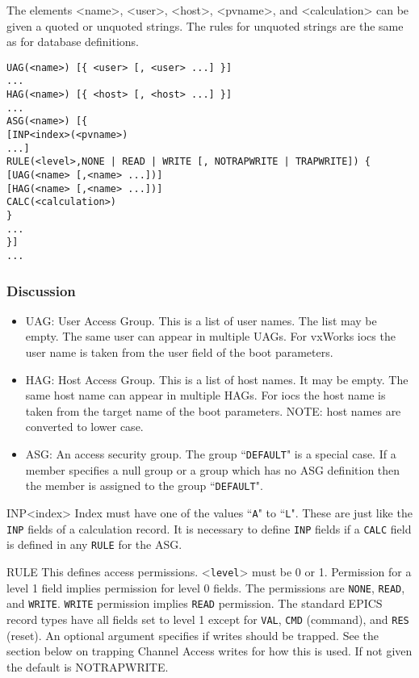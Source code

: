 The elements \textless{}name\textgreater{}, \textless{}user\textgreater{}, \textless{}host\textgreater{}, \textless{}pvname\textgreater{}, and \textless{}calculation\textgreater{} can be given a quoted or unquoted strings. The 
rules for unquoted strings are the same as for database definitions.



\begin{verbatim}UAG(<name>) [{ <user> [, <user> ...] }]
...
HAG(<name>) [{ <host> [, <host> ...] }]
...
ASG(<name>) [{
[INP<index>(<pvname>)
...]
RULE(<level>,NONE | READ | WRITE [, NOTRAPWRITE | TRAPWRITE]) {
[UAG(<name> [,<name> ...])]
[HAG(<name> [,<name> ...])]
CALC(<calculation>)
}
...
}]
...
\end{verbatim}
\subsubsection{Discussion}

\begin{itemize}\item {}UAG:  User Access Group. This is a list of user names. The list may be empty. The same user can appear in 
multiple UAGs. For vxWorks iocs the user name is taken from the user field of the boot parameters.

\item {}HAG: Host Access Group. This is a list of host names. It may be empty. The same host name can appear in 
multiple HAGs. For iocs the host name is taken from the target name of the boot parameters. NOTE: host names 
are converted to lower case.

\item {}ASG: An access security group. The group ``\verb|DEFAULT|" is a special case. If a member specifies a null group or a 
group which has no ASG definition then the member is assigned to the group ``\verb|DEFAULT|".

\end{itemize}INP\textless{}index\textgreater{}  Index must have one of the values ``\verb|A|" to ``\verb|L|". These are just like the \verb|INP| fields of a 
calculation record. It is necessary to define \verb|INP| fields if a \verb|CALC| field is defined in any \verb|RULE| for the ASG.

RULE   This defines access permissions. \textless{}\verb|level|\textgreater{} must be 0 or 1. Permission for a level 1 field implies 
permission for level 0 fields. The permissions are \verb|NONE|, \verb|READ|, and \verb|WRITE|. \verb|WRITE| permission implies 
\verb|READ| permission. The standard EPICS record types have all fields set to level 1 except for \verb|VAL|, \verb|CMD| 
(command), and \verb|RES| (reset). An optional argument specifies if writes should be trapped. See the section 
below on trapping Channel Access writes for how this is used. If not given the default is NOTRAPWRITE.

